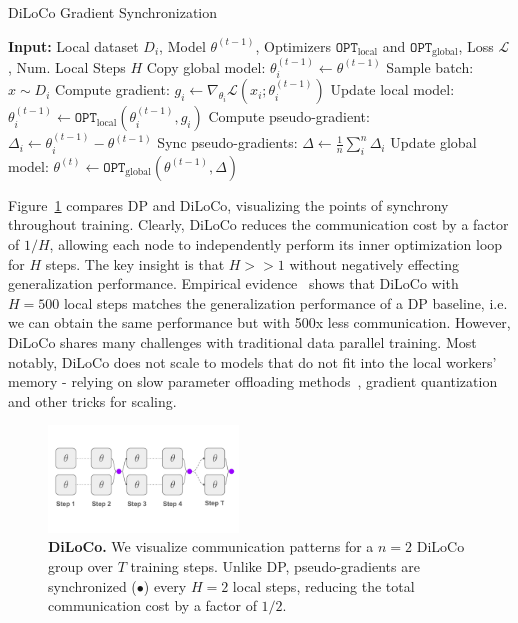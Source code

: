 \documentclass{article}
\newcommand{\purplecircle}{\textcolor{ppurple}{\LARGE$\bullet$}}
\begin{document}
\begin{algorithm}
\caption{DiLoCo Gradient Synchronization}
\label{alg:diloco}
\begin{algorithmic}
\State \textbf{Input:} Local dataset $D_i$, Model $\theta^{(t-1)}$, Optimizers $\mathtt{OPT}_{\text{local}}$ and $\mathtt{OPT}_{\text{global}}$, Loss $\mathcal{L}$, Num. Local Steps $H$ 
\State Copy global model: $\theta_i^{(t-1)} \gets \theta^{(t-1)}$
  \State Sample batch: $x \sim D_i$
  \State Compute gradient: $g_i \gets \nabla_{\theta_i} \mathcal{L}(x_i; \theta_i^{(t-1)})$
  \State Update local model: $\theta_i^{(t-1)} \gets \mathtt{OPT}_{\text{local}}(\theta_i^{(t-1)}, g_i)$
\EndFor
\State Compute pseudo-gradient: $\Delta_i \gets \theta_i^{(t-1)} - \theta^{(t-1)}$
\State Sync pseudo-gradients: $\Delta \gets \frac{1}{n}\sum_i^n \Delta_i$ 
\State Update global model: $\theta^{(t)} \gets \mathtt{OPT}_{\text{global}}(\theta^{(t-1)}, \Delta)$
\end{algorithmic}
\end{algorithm}

Figure~\ref{fig:diloco} compares DP and DiLoCo, visualizing the points of
synchrony throughout training. Clearly, DiLoCo reduces the communication cost by
a factor of $1/H$, allowing each node to independently perform its inner
optimization loop for $H$ steps. The key insight is that $H>>1$ without
negatively effecting generalization performance. Empirical
evidence~\cite{douillard2023diloco,jaghouar2024opendiloco} shows that DiLoCo
with $H=500$ local steps matches the generalization performance of a DP
baseline, i.e. we can obtain the same performance but with 500x less
communication. However, DiLoCo shares many challenges with traditional data
parallel training. Most notably, DiLoCo does not scale to models that do not fit
into the local workers' memory - relying on slow parameter offloading
methods~\cite{cui2016}, gradient quantization~\cite{jaghouar2024intellect1} and
other tricks for scaling.

\begin{figure}[ht]
    \centering
    \vspace{0.5cm}
    \includegraphics[width=0.45\textwidth]{figures/diloco.pdf}
    \caption{\textbf{DiLoCo.} We visualize communication patterns for a $n=2$
    DiLoCo group over $T$ training steps. Unlike DP, pseudo-gradients are
    synchronized (\purplecircle) every $H=2$ local steps, reducing the total
    communication cost by a factor of $1/2$.}
    \label{fig:diloco}
\end{figure}
\end{document}
